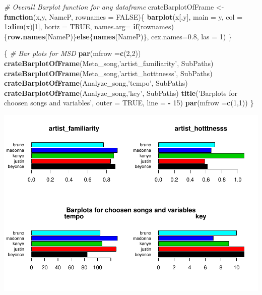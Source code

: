 \documentclass[]{article}
\newenvironment{Shaded}{\begin{snugshade}}{\end{snugshade}}
\newcommand{\KeywordTok}[1]{\textcolor[rgb]{0.13,0.29,0.53}{\textbf{#1}}}
\newcommand{\DataTypeTok}[1]{\textcolor[rgb]{0.13,0.29,0.53}{#1}}
\newcommand{\DecValTok}[1]{\textcolor[rgb]{0.00,0.00,0.81}{#1}}
\newcommand{\FloatTok}[1]{\textcolor[rgb]{0.00,0.00,0.81}{#1}}
\newcommand{\StringTok}[1]{\textcolor[rgb]{0.31,0.60,0.02}{#1}}
\newcommand{\CommentTok}[1]{\textcolor[rgb]{0.56,0.35,0.01}{\textit{#1}}}
\newcommand{\OtherTok}[1]{\textcolor[rgb]{0.56,0.35,0.01}{#1}}
\newcommand{\ControlFlowTok}[1]{\textcolor[rgb]{0.13,0.29,0.53}{\textbf{#1}}}
\newcommand{\OperatorTok}[1]{\textcolor[rgb]{0.81,0.36,0.00}{\textbf{#1}}}
\newcommand{\NormalTok}[1]{#1}
\begin{document}
\begin{Shaded}
\begin{Highlighting}[]
\CommentTok{# Overall Barplot function for any dataframe  }
\NormalTok{crateBarplotOfFrame <-}\StringTok{ }\ControlFlowTok{function}\NormalTok{(x,y, NameP, }\DataTypeTok{rownames =} \OtherTok{FALSE}\NormalTok{)\{}
  \KeywordTok{barplot}\NormalTok{(x[,y], }\DataTypeTok{main =}\NormalTok{ y, }\DataTypeTok{col =} \DecValTok{1}\OperatorTok{:}\KeywordTok{dim}\NormalTok{(x)[}\DecValTok{1}\NormalTok{], }\DataTypeTok{horiz =} \OtherTok{TRUE}\NormalTok{, }\DataTypeTok{names.arg=} \ControlFlowTok{if}\NormalTok{(rownames)\{}\KeywordTok{row.names}\NormalTok{(NameP)\}}\ControlFlowTok{else}\NormalTok{\{}\KeywordTok{names}\NormalTok{(NameP)\}, }\DataTypeTok{cex.names=}\FloatTok{0.8}\NormalTok{, }\DataTypeTok{las =} \DecValTok{1}\NormalTok{)}
\NormalTok{\}}

\NormalTok{\{}
\CommentTok{# Bar plots for MSD}
\KeywordTok{par}\NormalTok{(}\DataTypeTok{mfrow =}\KeywordTok{c}\NormalTok{(}\DecValTok{2}\NormalTok{,}\DecValTok{2}\NormalTok{))}
\KeywordTok{crateBarplotOfFrame}\NormalTok{(Meta_song,}\StringTok{'artist_familiarity'}\NormalTok{, SubPaths)}
\KeywordTok{crateBarplotOfFrame}\NormalTok{(Meta_song,}\StringTok{'artist_hotttnesss'}\NormalTok{, SubPaths)}
\KeywordTok{crateBarplotOfFrame}\NormalTok{(Analyze_song,}\StringTok{'tempo'}\NormalTok{, SubPaths)}
\KeywordTok{crateBarplotOfFrame}\NormalTok{(Analyze_song,}\StringTok{'key'}\NormalTok{, SubPaths)}
\KeywordTok{title}\NormalTok{(}\StringTok{'Barplots for choosen songs and variables'}\NormalTok{, }\DataTypeTok{outer =} \OtherTok{TRUE}\NormalTok{, }\DataTypeTok{line =} \OperatorTok{-}\StringTok{ }\DecValTok{15}\NormalTok{)}
\KeywordTok{par}\NormalTok{(}\DataTypeTok{mfrow =}\KeywordTok{c}\NormalTok{(}\DecValTok{1}\NormalTok{,}\DecValTok{1}\NormalTok{))}
\NormalTok{\}}
\end{Highlighting}
\end{Shaded}

\includegraphics{Project2_files/figure-latex/MSDBarplots-1.pdf}
\end{document}
